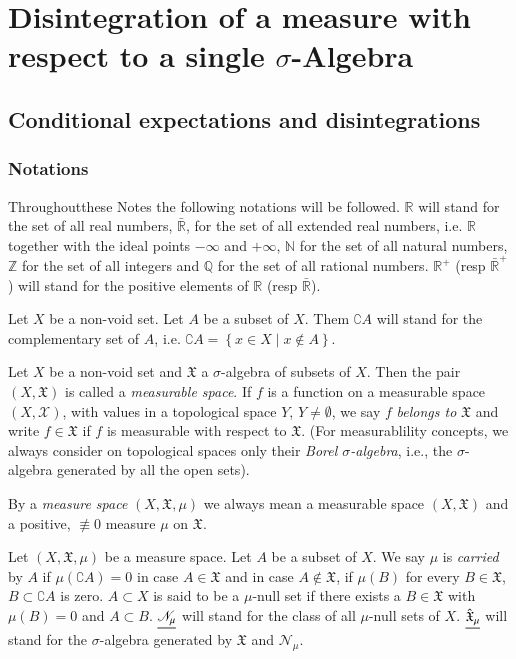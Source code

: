 \part[Disintegration of a measure with respect to a single...]{Disintegration of a measure with respect to a single
  $\sigma$-Algebra}\label{part1}


\chapter{Conditional expectations and disintegrations}\label{part1:chap1}

\section{Notations}\label{part1:chap1:sec1}

Throughout\pageoriginale these Notes the following notations will be
followed. $\mathbb{R}$ will stand for the set of all real numbers,
$\bar{\mathbb{R}}$, for the set of all extended real numbers,
i.e. $\mathbb{R}$ together with the ideal points $-\infty$ and $+
\infty$, $\mathbb{N}$ for the set of all natural numbers, $\mathbb{Z}$
for the set of all integers and $\mathbb{Q}$ for the set of all
rational numbers. $\mathbb{R}^+$ (resp $\bar{\mathbb{R}}^+$) will
stand for the positive elements of $\mathbb{R}$ (resp
$\bar{\mathbb{R}}$). 

Let $X$ be a non-void set. Let $A$ be a subset of $X$. Them
$\complement A$ will stand for the complementary set of $A$,
i.e. $\complement A = \left\{ x \in X \mid x \notin A  \right\}$. 

Let $X$ be a non-void set and $\mathfrak{X}$ a $\sigma$-algebra of
subsets of $X$. Then the pair $(X, \mathfrak{X})$ is called a
\textit{measurable space}. If $f$ is a function on a measurable space
$(X, \mathscr{X})$, with values in a topological space $Y$, $Y \neq
\emptyset$, we say $f$  \textit{belongs to } $\mathfrak{X}$ and write
$f\in \mathfrak{X}$ if $f$ is measurable with respect to
$\mathfrak{X}$. (For measurablility concepts, we always consider on
topological spaces only their \textit{Borel $\sigma$-algebra}, i.e.,
the $\sigma$-algebra generated by all the open sets). 

By a \textit{measure space} $(X, \mathfrak{X}, \mu)$  we always mean a
measurable space $(X, \mathfrak{X})$ and a positive, $\not\equiv 0$
measure $\mu$ on $\mathfrak{X}$. 


Let $(X, \mathfrak{X}, \mu)$ be a measure space. Let $A$ be a subset
of $X$. We say $\mu$ is \textit{carried} by $A$ if $\mu (\complement
A) = 0$ in case $A \in \mathfrak{X}$ and in case $A \notin
\mathfrak{X}$, if $\mu(B)$ for every $B \in \mathfrak{X}$, $B \subset
\complement A$ is zero. $A \subset X$ is said to be a $\mu$-null set
if there exists a $B \in \mathfrak{X}$ with $\mu(B) = 0$ and $A
\subset B$. $\underline{\mathscr{N}_\mu}$ will stand for the class of all
$\mu$-null sets of $X$. $\underline{\hat{\mathfrak{X}}_\mu}$ will stand for
the $\sigma$-algebra generated by $\mathfrak{X}$ and
$\mathscr{N}_\mu$.



